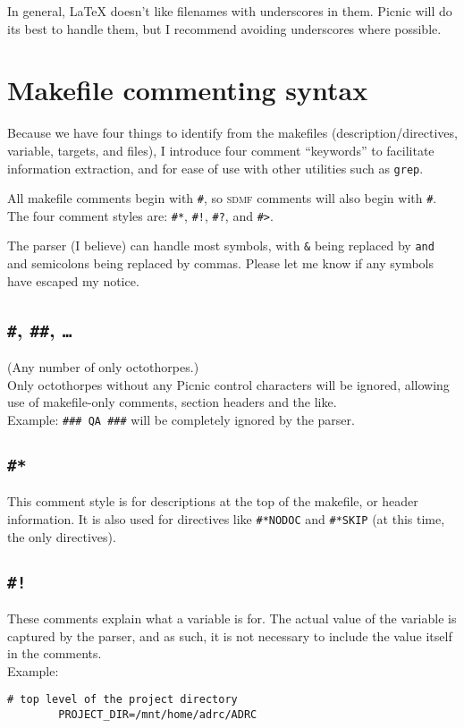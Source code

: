 \documentclass[oneside,11pt]{article}
\newcommand{\sdmf}{\textsc{sdmf}}
\begin{document}
	In general, \LaTeX{} doesn't like filenames with underscores in them. Picnic will do its best to handle them, but I recommend avoiding underscores where possible. 
	
	\section{Makefile commenting syntax}
	
	Because we have four things to identify from the makefiles (description/directives, variable, targets, and files), I introduce four comment ``keywords'' to facilitate information extraction, and for ease of use with other utilities such as \texttt{grep}.
	
	All makefile comments begin with \texttt{\#}, so \sdmf{} comments will also begin with \texttt{\#}. The four comment styles are: \texttt{\#*}, \texttt{\#!}, \texttt{\#?}, and \texttt{\#>}.
	
	The parser (I believe) can handle most symbols, with \texttt{\&} being replaced by \texttt{and} and semicolons being replaced by commas. Please let me know if any symbols have escaped my notice.
	
	\subsection{\texttt{\#}, \texttt{\#\#}, \texttt{\ldots}}
	
	(Any number of only octothorpes.) \\ Only octothorpes without any Picnic 
	control characters will be ignored, allowing use of  makefile-only 
	comments, section headers and the like. \\ Example: \texttt{\#\#\# QA 
	\#\#\#} will be completely ignored by the parser.
	
	\subsection{\texttt{\#*}}
	
	This comment style is for descriptions at the top of the makefile, or header information. It is also used for directives like \texttt{\#*NODOC} and \texttt{\#*SKIP} (at this time, the only directives).
	
	\subsection{\texttt{\#!}}
	
	These comments explain what a variable is for. The actual value of the variable is captured by the parser, and as such, it is not necessary to include the value itself in the comments. \\
	Example: 
	\begin{lstlisting}[gobble=16, basicstyle=\ttfamily]
		# top level of the project directory
		PROJECT_DIR=/mnt/home/adrc/ADRC 
	\end{lstlisting}
	
\end{document}
